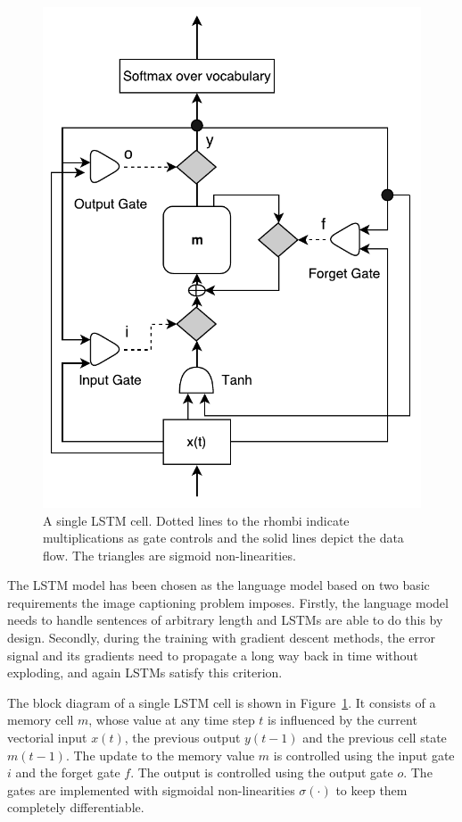 \begin{figure}[h]
  \begin{center}
    \includegraphics[width=0.5\linewidth]{images/LstmBlockDiag.pdf}
  \end{center}
  \vspace*{-6mm}
  \caption{A single LSTM cell. Dotted lines
    to the rhombi indicate multiplications as gate controls and the
    solid lines depict the data flow. The triangles are sigmoid
    non-linearities.}
  \label{fig:lstmcell}
\end{figure}

The LSTM model has been chosen as the language model based on two basic
requirements the image captioning problem imposes.
Firstly, the language model needs to handle sentences of arbitrary length and
LSTMs are able to do this by design.
Secondly, during the training with gradient descent methods, the error signal
and its gradients need to propagate a long way back in time without exploding,
and again LSTMs satisfy this criterion.

The block diagram of a single LSTM cell is shown in Figure~\ref{fig:lstmcell}.
It consists of a memory cell $m$, whose value at any time step $t$ is influenced
by the current vectorial input $x(t)$, the previous output $y(t-1)$ and the
previous cell state $m(t-1)$.
The update to the memory value $m$ is controlled using the input gate $i$ and
the forget gate $f$.
The output is controlled using the output gate $o$.
The gates are implemented with sigmoidal non-linearities $\sigma(\cdot)$ to keep
them completely differentiable.

